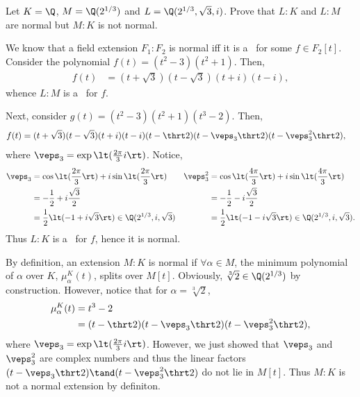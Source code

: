 \documentclass{article}
\begin{document}
\setcounter{section}{7} %
\begin{exercise}
Let \( K = \Q \), \( M = \Q(2^{1/3}) \) and \( L = \Q(2^{1/3}, \sqrt 3, i) \).
Prove that \( L:K \) and \( L:M \) are normal but \( M:K \) is not normal.
\end{exercise}
\begin{solution}
We know that a field extension \( F_1:F_2 \) is normal iff it is a \sfe~for some \( f\in F_2[t] \).
Consider the polynomial \( f(t) = (t^2-3)(t^2+1) \).
Then, \begin{align*}
  f(t) &= (t+\sqrt 3)(t-\sqrt 3)(t+i)(t-i),
\end{align*}
whence \( L:M \) is a \sfe~for \( f \).

Next, consider \( g(t) = (t^2-3)(t^2+1)(t^3-2) \).
Then, \begin{align*}
  f(t) &= (t+\sqrt 3)(t-\sqrt 3)(t+i)(t-i)(t-\thrt 2)(t-\veps_3\thrt 2)(t-\veps_3^2\thrt 2),
\end{align*}
where \( \veps_3 = \exp\lt(\frac{2\pi}{3}i\rt) \).
Notice, \begin{align*}
  \veps_3 &= \cos\lt(\frac{2\pi}{3}\rt) + i\sin\lt(\frac{2\pi}{3}\rt)    & \veps_3^2 &= \cos\lt(\frac{4\pi}{3}\rt) + i\sin\lt(\frac{4\pi}{3}\rt) \\
          &= -\frac{1}{2}+i\frac{\sqrt 3}{2} & &= -\frac{1}{2}-i\frac{\sqrt 3}{2} \\
          &= \frac{1}{2}\lt(-1+i\sqrt 3\rt)\in \Q(2^{1/3},i,\sqrt 3) & &= \frac{1}{2}\lt(-1-i\sqrt 3\rt) \in \Q(2^{1/3},i,\sqrt 3).
\end{align*}
Thus \( L:K \) is a \sfe~for \( f \), hence it is normal.

By definition, an extension \( M:K \) is normal if \( \forall \alpha\in M \), the minimum polynomial of \( \alpha \) over \( K \), \( \mu_\alpha^K(t) \), splits over \( M[t] \).
Obviously, \( \sqrt[3]2 \in \Q(2^{1/3}) \) by construction.
However, notice that for \( \alpha=\sqrt[3]2 \), \begin{align*}
  \mu_\alpha^K(t) &= t^3-2 \\
  &= (t-\thrt 2)(t-\veps_3\thrt 2)(t-\veps_3^2\thrt 2),
\end{align*}
where \( \veps_3 = \exp\lt(\frac{2\pi}{3}i\rt) \).
However, we just showed that \( \veps_3 \) and \( \veps_3^2 \) are complex numbers and thus the linear factors \( (t-\veps_3\thrt 2)\tand (t-\veps_3^2\thrt 2) \) do not lie in \( M[t] \).
Thus \( M:K \) is not a normal extension by definiton.
\end{solution}
\end{document}
